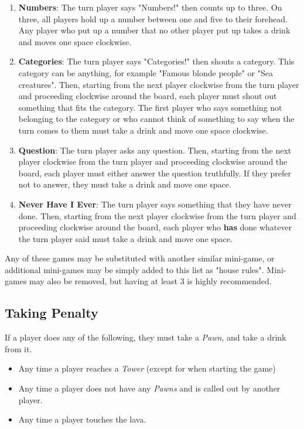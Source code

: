 \documentclass[12pt]{article}
\begin{document}
\begin{enumerate}
\item \textbf{Numbers}: The turn player says "Numbers!" then counts up to three. On three, all players hold up a number between one and five to their forehead. Any player who put up a number that no other player put up takes a drink and moves one space clockwise.
\item \textbf{Categories}: The turn player says "Categories!" then shouts a category. This category can be anything, for example "Famous blonde people" or "Sea creatures". Then, starting from the next player clockwise from the turn player and proceeding clockwise around the board, each player must shout out something that fits the category. The first player who says something not belonging to the category or who cannot think of something to say when the turn comes to them must take a drink and move one space clockwise.
\item \textbf{Question}: The turn player asks any question. Then, starting from the next player clockwise from the turn player and proceeding clockwise around the board, each player must either answer the question truthfully. If they prefer not to answer, they must take a drink and move one space.
\item \textbf{Never Have I Ever}: The turn player says something that they have never done. Then, starting from the next player clockwise from the turn player and proceeding clockwise around the board, each player who \textbf{has} done whatever the turn player said must take a drink and move one space.
\end{enumerate}

Any of these games may be substituted with another similar mini-game, or additional mini-games may be simply added to this list as "house rules". Mini-games may also be removed, but having at least 3 is highly recommended. \\

\subsection{Taking Penalty} \label{penalty}

If a player does any of the following, they must take a \textit{Pawn}, and take a drink from it. \\

\begin{itemize}
\item Any time a player reaches a \textit{Tower} (except for when starting the game)
\item Any time a player does not have any \textit{Pawns} and is called out by another player.
\item Any time a player touches the lava.
\end{itemize}
\end{document}

